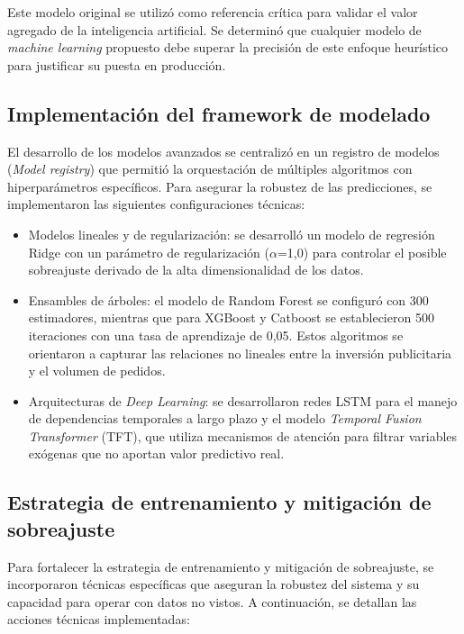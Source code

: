 Este modelo original se utilizó como referencia crítica para validar el valor agregado de la inteligencia artificial. Se determinó que cualquier modelo de \textit{machine learning} propuesto debe superar la precisión de este enfoque heurístico para justificar su puesta en producción.




\subsection{Implementación del framework de modelado}

El desarrollo de los modelos avanzados se centralizó en un registro de modelos (\textit{Model registry}) que permitió la orquestación de múltiples algoritmos con hiperparámetros específicos. Para asegurar la robustez de las predicciones, se implementaron las siguientes configuraciones técnicas:


\begin{itemize}

	\item Modelos lineales y de regularización: se desarrolló un modelo de regresión Ridge con un parámetro de regularización ($\alpha$=1,0) para controlar el posible sobreajuste derivado de la alta dimensionalidad de los datos.
	\item Ensambles de árboles: el modelo de Random Forest se configuró con 300 estimadores, mientras que para XGBoost y Catboost se establecieron 500 iteraciones con una tasa de aprendizaje de 0,05. Estos algoritmos se orientaron a capturar las relaciones no lineales entre la inversión publicitaria y el volumen de pedidos.
	
	\item Arquitecturas de \textit{Deep Learning}: se desarrollaron redes LSTM para el manejo de dependencias temporales a largo plazo y el modelo \textit{Temporal Fusion Transformer} (TFT), que utiliza mecanismos de atención para filtrar variables exógenas que no aportan valor predictivo real.
	

\end{itemize}


\subsection{Estrategia de entrenamiento y mitigación de sobreajuste}

Para fortalecer la estrategia de entrenamiento y mitigación de sobreajuste, se incorporaron técnicas específicas que aseguran la robustez del sistema y su capacidad para operar con datos no vistos. A continuación, se detallan las acciones técnicas implementadas:


